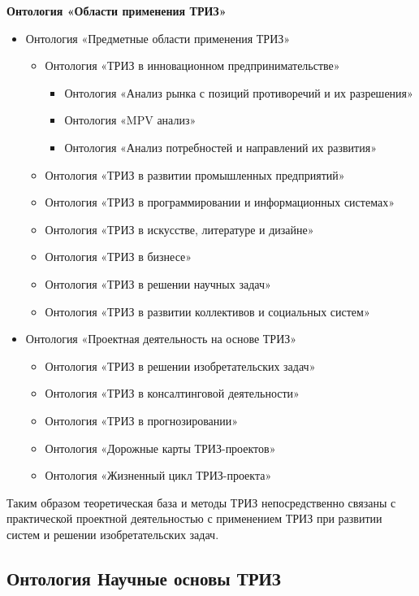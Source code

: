 \documentclass[11pt,a4paper]{article}
\begin{document}
\textbf{Онтология «Области применения ТРИЗ»}
\begin{itemize}
\item Онтология «Предметные области применения ТРИЗ»
  \begin{itemize}[noitemsep]
  \item Онтология «ТРИЗ в инновационном предпринимательстве»
    \begin{itemize}[noitemsep]
    \item Онтология «Анализ рынка с позиций противоречий и их разрешения»
    \item Онтология «MPV анализ»
    \item Онтология «Анализ потребностей и направлений их развития»
    \end{itemize}
  \item Онтология «ТРИЗ в развитии промышленных предприятий»
  \item Онтология «ТРИЗ в программировании и информационных системах»
  \item Онтология «ТРИЗ в искусстве, литературе и дизайне»
  \item Онтология «ТРИЗ в бизнесе»
  \item Онтология «ТРИЗ в решении научных задач»
  \item Онтология «ТРИЗ в развитии коллективов и социальных систем»
  \end{itemize}
\item Онтология «Проектная деятельность на основе ТРИЗ»
  \begin{itemize}[noitemsep]
  \item Онтология «ТРИЗ в решении изобретательских задач»
  \item Онтология «ТРИЗ в консалтинговой деятельности»
  \item Онтология «ТРИЗ в прогнозировании»
  \item Онтология «Дорожные карты ТРИЗ-проектов»
  \item Онтология «Жизненный цикл ТРИЗ-проекта»
  \end{itemize}
\end{itemize}

Таким образом теоретическая база и методы ТРИЗ непосредственно связаны с
практической проектной деятельностью с применением ТРИЗ при развитии систем и
решении изобретательских задач.

\subsection{Онтология Научные основы ТРИЗ}
\end{document}
